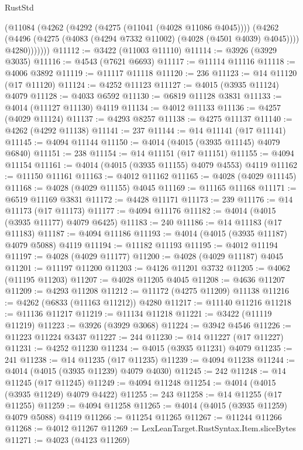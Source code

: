 \begin{lexlean}{RustStd}
\begin{coremodule}
            (@11084
              (@4262
                (@4292 (@4275 (@11041 (@4028 @11086 @4045))))
                (@4262
                  (@4496 (@4275 (@4083 (@4294 @7332 @11002) (@4028 (@4501 @4039) @4045))))
                  @4280)))))))
@11112 := @3422 (@11003 @11110)
@11114 := @3926 (@3929 @3035)
@11116 := @4543 (@7621 @6693)
@11117 := @11114 @11116
@11118 := @4006 @3892
@11119 := @11117 @11118
@11120 := 236
@11123 := @14 @11120 (@17 @11120)
@11124 := @4252 @11123
@11127 := @4015 (@3935 @11124) @4079
@11128 := @4033 @6592
@11130 := @6819 @11128 @3831
@11133 := @4014 (@11127 @11130) @4119
@11134 := @4012 @11133
@11136 := @4257 (@4029 @11124)
@11137 := @4293 @8257
@11138 := @4275 @11137
@11140 := @4262 (@4292 @11138)
@11141 := 237
@11144 := @14 @11141 (@17 @11141)
@11145 := @4094 @11144
@11150 := @4014 (@4015 (@3935 @11145) @4079 @6840)
@11151 := 238
@11154 := @14 @11151 (@17 @11151)
@11155 := @4094 @11154
@11161 := @4014 (@4015 (@3935 @11155) @4079 @4553) @4119
@11162 := @11150 @11161
@11163 := @4012 @11162
@11165 := @4028 (@4029 @11145)
@11168 := @4028 (@4029 @11155) @4045
@11169 := @11165 @11168
@11171 := @6519 @11169 @3831
@11172 := @4428 @11171
@11173 := 239
@11176 := @14 @11173 (@17 @11173)
@11177 := @4094 @11176
@11182 := @4014 (@4015 (@3935 @11177) @4079 @6425)
@11183 := 240
@11186 := @14 @11183 (@17 @11183)
@11187 := @4094 @11186
@11193 := @4014 (@4015 (@3935 @11187) @4079 @5088) @4119
@11194 := @11182 @11193
@11195 := @4012 @11194
@11197 := @4028 (@4029 @11177)
@11200 := @4028 (@4029 @11187) @4045
@11201 := @11197 @11200
@11203 := @4126 @11201 @3732
@11205 := @4062 (@11195 @11203)
@11207 := @4028 @11205 @4045
@11208 := @4636 @11207
@11209 := @4293 @11208
@11212 := @11172 (@4275 @11209) @11138
@11216 := @4262 (@6833 (@11163 @11212)) @4280
@11217 := @11140 @11216
@11218 := @11136 @11217
@11219 := @11134 @11218
@11221 := @3422 (@11119 @11219)
@11223 := @3926 (@3929 @3068)
@11224 := @3942 @4546
@11226 := @11223 @11224 @3437
@11227 := 244
@11230 := @14 @11227 (@17 @11227)
@11231 := @4252 @11230
@11234 := @4015 (@3935 @11231) @4079
@11235 := 241
@11238 := @14 @11235 (@17 @11235)
@11239 := @4094 @11238
@11244 := @4014 (@4015 (@3935 @11239) @4079 @4030)
@11245 := 242
@11248 := @14 @11245 (@17 @11245)
@11249 := @4094 @11248
@11254 := @4014 (@4015 (@3935 @11249) @4079 @4422)
@11255 := 243
@11258 := @14 @11255 (@17 @11255)
@11259 := @4094 @11258
@11265 := @4014 (@4015 (@3935 @11259) @4079 @5088) @4119
@11266 := @11254 @11265
@11267 := @11244 @11266
@11268 := @4012 @11267
@11269 := LexLeanTarget.RustSyntax.Item.sliceBytes
@11271 := @4023 (@4123 @11269)

\end{coremodule}
\end{lexlean}
